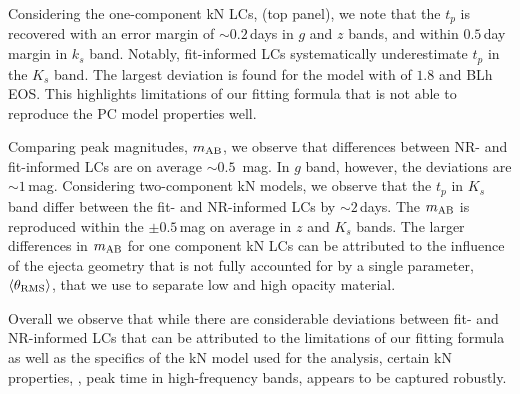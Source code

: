 Considering the one-component \ac{kN} \acp{LC}, (top panel), we note that the $t_p$ is 
recovered with an error margin of ${\sim}0.2\,$days in $g$ and $z$ bands, and within 
$0.5\,$day margin in $k_s$ band. Notably, fit-informed \acp{LC} 
systematically underestimate $t_p$ in the $K_s$ band. 
%
The largest deviation is found for the 
model with \mr{} of $1.8$ and BLh \ac{EOS}. This highlights limitations of our 
fitting formula that is not able to reproduce the \ac{PC} model properties well.

Comparing peak magnitudes, $m_{\rm AB}$, we observe that differences 
between \ac{NR}- and fit-informed \acp{LC} are on average ${\sim}0.5$~mag. 
In $g$ band, however, the deviations are ${\sim}1\,$mag.
Considering two-component \ac{kN} models, we observe that the 
$t_p$ in $K_s$ band differ between the fit- and \ac{NR}-informed \acp{LC} by 
${\sim}2\,$days. The $m_{\rm AB}$ is reproduced within the ${\pm}0.5\,$mag 
on average in $z$ and $K_s$ bands.
%
The larger differences in $m_{\rm AB}$ for one component \ac{kN} \acp{LC} 
can be attributed to the influence of the ejecta geometry that is not 
fully accounted for by a single parameter, $\langle\theta_{\rm RMS}\rangle$, that we use to 
separate low and high opacity material. 

Overall we observe that while there are considerable deviations between fit- and 
\ac{NR}-informed \acp{LC} that can be attributed to the limitations of 
our fitting formula as well as the specifics of the \ac{kN} model used for the 
analysis, certain \ac{kN} properties, \eg, peak time in high-frequency bands, 
appears to be captured robustly. 

